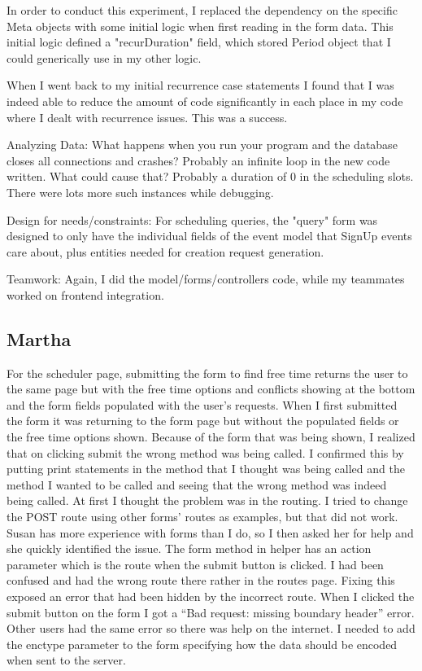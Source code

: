 \documentclass{article}
\begin{document}
In order to conduct this experiment, I replaced the dependency on the specific Meta objects with some initial logic when first reading in the form data. This initial logic defined a "recurDuration" field, which stored Period object that I could generically use in my other logic.

When I went back to my initial recurrence case statements I found that I was indeed able to reduce the amount of code significantly in each place in my code where I dealt with recurrence issues. This was a success.

Analyzing Data: What happens when you run your program and the database closes all connections and crashes? Probably an infinite loop in the new code written. What could cause that? Probably a duration of 0 in the scheduling slots. There were lots more such instances while debugging.

Design for needs/constraints: For scheduling queries, the "query" form was designed to only have the individual fields of the event model that SignUp events care about, plus entities needed for creation request generation.

Teamwork: Again, I did the model/forms/controllers code, while my teammates worked on frontend integration.

\subsection{Martha}
For the scheduler page, submitting the form to find free time returns the user to the same page but with the free time options and conflicts showing at the bottom and the form fields populated with the user’s requests.  When I first submitted the form it was returning to the form page but without the populated fields or the free time options shown.  Because of the form that was being shown, I realized that on clicking submit the wrong method was being called.  I confirmed this by putting print statements in the method that I thought was being called and the method I wanted to be called and seeing that the wrong method was indeed being called.  At first I thought the problem was in the routing.  I tried to change the POST route using other forms’ routes as examples, but that did not work.  Susan has more experience with forms than I do, so I then asked her for help and she quickly identified the issue.  The form method in helper has an action parameter which is the route when the submit button is clicked.  I had been confused and had the wrong route there rather in the routes page.  Fixing this exposed an error that had been hidden by the incorrect route.  When I clicked the submit button on the form I got a “Bad request: missing boundary header” error.  Other users had the same error so there was help on the internet.  I needed to add the enctype parameter to the form specifying how the data should be encoded when sent to the server.
\end{document}
